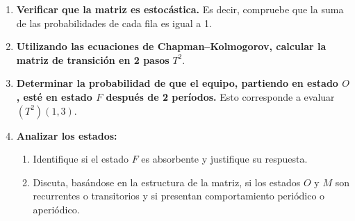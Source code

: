 \documentclass{article}
\begin{document}
\begin{problem}
\begin{enumerate}
    \item \textbf{Verificar que la matriz es estocástica.} Es decir, compruebe que la suma de las probabilidades de cada fila es igual a 1.
    
    \item \textbf{Utilizando las ecuaciones de Chapman–Kolmogorov, calcular la matriz de transición en 2 pasos} \(T^2\).
    
    \item \textbf{Determinar la probabilidad de que el equipo, partiendo en estado \(O\), esté en estado \(F\) después de 2 períodos.} Esto corresponde a evaluar \((T^2)(1,3)\).
    
    \item \textbf{Analizar los estados:}  
    \begin{enumerate}
        \item Identifique si el estado \(F\) es absorbente y justifique su respuesta.
        \item Discuta, basándose en la estructura de la matriz, si los estados \(O\) y \(M\) son recurrentes o transitorios y si presentan comportamiento periódico o aperiódico.
    \end{enumerate}
\end{enumerate}
\end{problem}
\end{document}
